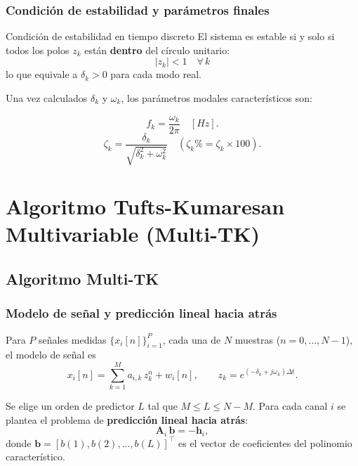     \subsubsection{Condición de estabilidad y parámetros finales}

    \begin{alertblock}{Condición de estabilidad en tiempo discreto}
        El sistema es estable si y solo si todos los polos $z_k$ están \textbf{dentro} del círculo unitario:
        \begin{equation}
            |z_k| < 1 \quad \forall\, k
            \label{eq:stability_z}
        \end{equation}
        lo que equivale a $\delta_k > 0$ para cada modo real.
    \end{alertblock}

    
    Una vez calculados $\delta_k$ y $\omega_k$, los parámetros modales característicos son:

    \begin{equation}
    f_k = \dfrac{\omega_k}{2\pi}\quad [Hz].
    \label{eq:freq_final}
    \end{equation}
    \begin{equation}
    \zeta_k = \dfrac{\delta_k}{\sqrt{\delta_k^2 + \omega_k^2}} \quad ( \zeta_k\% = \zeta_k \times 100).
    \label{eq:damp_final}
    \end{equation}

\section{Algoritmo Tufts-Kumaresan Multivariable (Multi-TK)}

\subsection{Algoritmo Multi-TK}
\subsubsection{Modelo de señal y predicción lineal hacia atrás}

Para $P$ señales medidas $\{x_i[n]\}_{i=1}^P$, cada una de $N$ muestras ($n=0,\dots,N-1$), el modelo de señal es
\[
x_i[n] = \sum_{k=1}^{M} a_{i,k}\, z_k^n + w_i[n], \qquad z_k = e^{(-\delta_k + j\omega_k)\Delta t}.
\]

Se elige un orden de predictor $L$ tal que $M \le L \le N-M$. Para cada canal $i$ se plantea el problema de \textbf{predicción lineal hacia atrás}:
\begin{equation}
\mathbf{A}_i\,\mathbf{b} = -\mathbf{h}_i,
\label{eq:backward_pred}
\end{equation}
donde $\mathbf{b}=[b(1),b(2),\dots,b(L)]^\top$ es el vector de coeficientes del polinomio característico.

